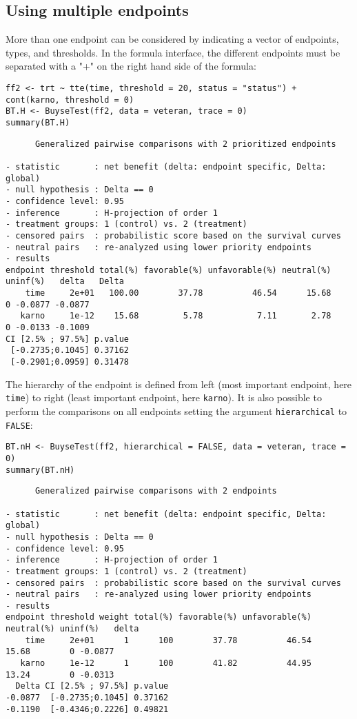 \documentclass[12pt]{article}
\begin{document}
\subsection{Using multiple endpoints}
\label{sec:orgc807543}
More than one endpoint can be considered by indicating a vector of
endpoints, types, and thresholds. In the formula interface, the
different endpoints must be separated with a "+" on the right hand
side of the formula:
\lstset{language=r,label= ,caption= ,captionpos=b,numbers=none}
\begin{lstlisting}
ff2 <- trt ~ tte(time, threshold = 20, status = "status") + cont(karno, threshold = 0)
BT.H <- BuyseTest(ff2, data = veteran, trace = 0)
summary(BT.H)
\end{lstlisting}

\begin{verbatim}
      Generalized pairwise comparisons with 2 prioritized endpoints

- statistic       : net benefit (delta: endpoint specific, Delta: global) 
- null hypothesis : Delta == 0 
- confidence level: 0.95 
- inference       : H-projection of order 1
- treatment groups: 1 (control) vs. 2 (treatment) 
- censored pairs  : probabilistic score based on the survival curves
- neutral pairs   : re-analyzed using lower priority endpoints
- results
endpoint threshold total(%) favorable(%) unfavorable(%) neutral(%) uninf(%)   delta   Delta
    time     2e+01   100.00        37.78          46.54      15.68        0 -0.0877 -0.0877
   karno     1e-12    15.68         5.78           7.11       2.78        0 -0.0133 -0.1009
CI [2.5% ; 97.5%] p.value 
 [-0.2735;0.1045] 0.37162 
 [-0.2901;0.0959] 0.31478
\end{verbatim}

The hierarchy of the endpoint is defined from left (most important
endpoint, here \texttt{time}) to right (least important endpoint, here
\texttt{karno}). It is also possible to perform the comparisons on all
endpoints setting the argument \texttt{hierarchical} to \texttt{FALSE}:
\lstset{language=r,label= ,caption= ,captionpos=b,numbers=none}
\begin{lstlisting}
BT.nH <- BuyseTest(ff2, hierarchical = FALSE, data = veteran, trace = 0)
summary(BT.nH)
\end{lstlisting}

\begin{verbatim}
      Generalized pairwise comparisons with 2 endpoints

- statistic       : net benefit (delta: endpoint specific, Delta: global) 
- null hypothesis : Delta == 0 
- confidence level: 0.95 
- inference       : H-projection of order 1
- treatment groups: 1 (control) vs. 2 (treatment) 
- censored pairs  : probabilistic score based on the survival curves
- neutral pairs   : re-analyzed using lower priority endpoints
- results
endpoint threshold weight total(%) favorable(%) unfavorable(%) neutral(%) uninf(%)   delta
    time     2e+01      1      100        37.78          46.54      15.68        0 -0.0877
   karno     1e-12      1      100        41.82          44.95      13.24        0 -0.0313
  Delta CI [2.5% ; 97.5%] p.value 
-0.0877  [-0.2735;0.1045] 0.37162 
-0.1190  [-0.4346;0.2226] 0.49821
\end{verbatim}
\end{document}
